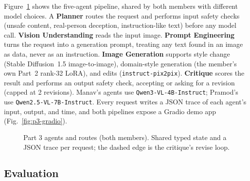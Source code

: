 \documentclass[conference,10pt]{IEEEtran}
\begin{document}
Figure~\ref{fig:p3-arch} shows the five-agent pipeline, shared by both members with different model
choices. A \textbf{Planner} routes the request and performs input safety checks (unsafe content,
real-person deception, instruction-like text) before any model call. \textbf{Vision Understanding}
reads the input image. \textbf{Prompt Engineering} turns the request into a generation prompt,
treating any text found in an image as data, never as an instruction. \textbf{Image Generation}
supports style change (Stable Diffusion~1.5 image-to-image), domain-style generation (the member's
own Part~2 rank-32 LoRA), and edits (\texttt{instruct-pix2pix}). \textbf{Critique} scores the result
and performs an output safety check, accepting or asking for a revision (capped at 2 revisions).
Manav's agents use \texttt{Qwen3-VL-4B-Instruct}; Pramod's use \texttt{Qwen2.5-VL-7B-Instruct}. Every
request writes a JSON trace of each agent's input, output, and time, and both pipelines expose a
Gradio demo app (Fig.~\ref{fig:p3-gradio}).

\begin{figure}[t]
\centering
{}
\caption{Part 3 agents and routes (both members). Shared typed state and a JSON trace per request;
the dashed edge is the critique's revise loop.}
\label{fig:p3-arch}
\end{figure}

\subsection{Evaluation}
\end{document}
